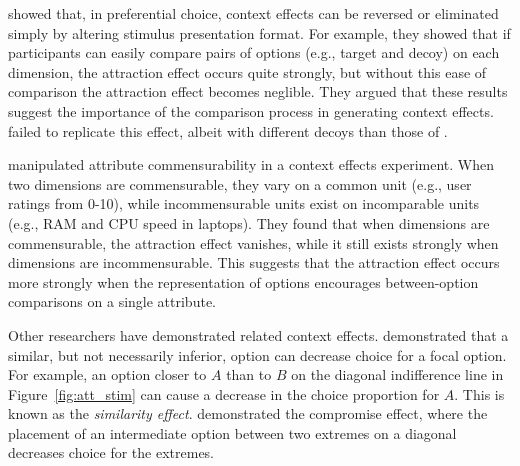 \textcite{cataldoComparisonProcessAccount2019b} showed that, in preferential choice, context effects can be reversed or eliminated simply by altering stimulus presentation format. For example, they showed that if participants can easily compare pairs of options (e.g., target and decoy) on each dimension, the attraction effect occurs quite strongly, but without this ease of comparison the attraction effect becomes neglible. They argued that these results suggest the importance of the comparison process in generating context effects. \textcite{hasan2025registered} failed to replicate this effect, albeit with different decoys than those of \textcite{cataldoComparisonProcessAccount2019b}. 


\textcite{hayes2024attribute} manipulated attribute commensurability in a context effects experiment. When two dimensions are commensurable, they vary on a common unit (e.g., user ratings from 0-10), while incommensurable units exist on incomparable units (e.g., RAM and CPU speed in laptops). They found that when dimensions are commensurable, the attraction effect vanishes, while it still exists strongly when dimensions are incommensurable. This suggests that the attraction effect occurs more strongly when the representation of options encourages between-option comparisons on a single attribute.

Other researchers have demonstrated related context effects. \textcite{tverskyEliminationAspectsTheory1972} demonstrated that a similar, but not necessarily inferior, option can decrease choice for a focal option. For example, an option closer to $A$ than to $B$ on the diagonal indifference line in Figure~\ref{fig:att_stim} can cause a decrease in the choice proportion for $A$. This is known as the \textit{similarity effect}. \textcite{simonsonChoiceBasedReasons1989b} demonstrated the compromise effect, where the placement of an intermediate option between two extremes on a diagonal decreases choice for the extremes. 


